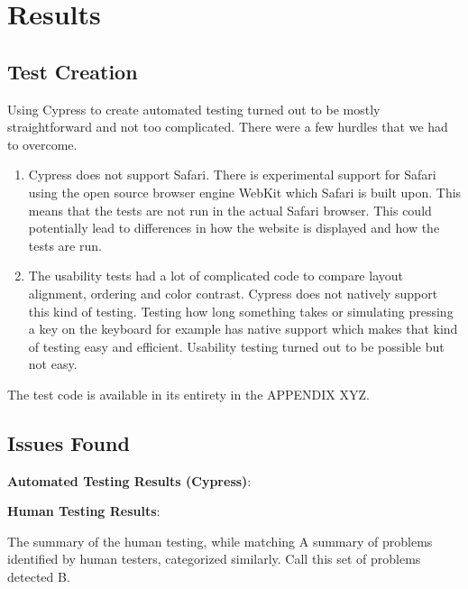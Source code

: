 \documentclass[journal,twocolumn]{IEEEtran}
\begin{document}
\section{Results}
\subsection{Test Creation}
Using Cypress to create automated testing turned out to be mostly straightforward and not too complicated. There were a few hurdles that we had to overcome.

\begin{enumerate}
    \item Cypress does not support Safari. There is experimental support for Safari using the open source browser engine WebKit which Safari is built upon. This means that the tests are not run in the actual Safari browser. This could potentially lead to differences in how the website is displayed and how the tests are run.
    \item The usability tests had a lot of complicated code to compare layout alignment, ordering and color contrast. Cypress does not natively support this kind of testing. Testing how long something takes or simulating pressing a key on the keyboard for example has native support which makes that kind of testing easy and efficient. Usability testing turned out to be possible but not easy.
\end{enumerate}

The test code is available in its entirety in the APPENDIX XYZ. %

\subsection{Issues Found}
\textbf{Automated Testing Results (Cypress)}:

\textbf{Human Testing Results}:

The summary of the human testing, while matching
A summary of problems identified by human testers, categorized similarly. Call this set of problems detected B.
\end{document}
